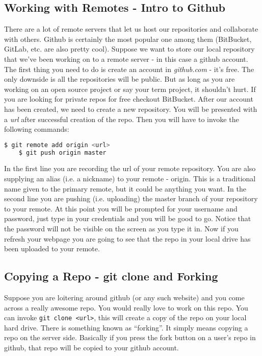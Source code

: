 \documentclass{article}
\begin{document}
\subsection{Working with Remotes - Intro to Github}
There are a lot of remote servers that let us host our repositories and collaborate with others.
Github is certainly the most popular one among them (BitBucket, GitLab, etc. are also pretty cool).
Suppose we want to store our local repository that we've been working on to a remote server - in this case a github account.
The first thing you need to do is create an account in \textit{github.com} - it's free.
The only downside is all the repositories will be public.
But as long as you are working on an open source project or say your term project, it shouldn't hurt.
If you are looking for private repos for free checkout BitBucket.
After our account has been created, we need to create a new repository.
You will be presented with a \textit{url} after successful creation of the repo.
Then you will have to invoke the following commands:
\begin{lstlisting}[language=bash]
	$ git remote add origin <url>
	$ git push origin master
\end{lstlisting}
In the first line you are recording the url of your remote repository.
You are also supplying an alias (i.e. a nickname) to your remote - origin.
This is a traditional name given to the primary remote, but it could be anything you want.
In the second line you are pushing (i.e. uploading) the master branch of your repository to your remote.
At this point you will be prompted for your username and password, just type in your credentials and you will be good to go.
Notice that the password will not be visible on the screen as you type it in.
Now if you refresh your webpage you are going to see that the repo in your local drive has been uploaded to your remote.

\subsection{Copying a Repo - git clone and Forking}
Suppose you are loitering around github (or any such website) and you come across a really awesome repo.
You would really love to work on this repo.
You can invoke \verb|git clone <url>|, this will create a copy of the repo on your local hard drive.
There is something known as ``forking''.
It simply means copying a repo on the server side.
Basically if you press the fork button on a user's repo in github, that repo will be copied to your github account.
\end{document}
